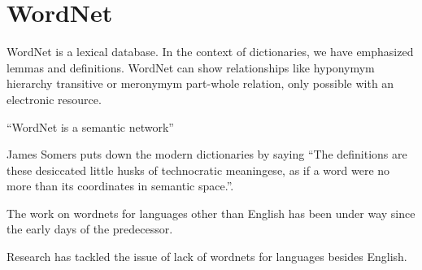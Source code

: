 \section{WordNet}%
\label{sec:wordnet}
WordNet\cite{fellbaum_wordnet_1998-1} is a lexical database.
In the context of dictionaries, we have emphasized lemmas and definitions.
WordNet can show relationships like hyponymym hierarchy transitive or meronymym part-whole relation, only possible with an electronic resource.

\enquote{WordNet is a semantic network}\cite{fellbaum_wordnet_1998-1}

James Somers puts down the modern dictionaries by saying \enquote{The definitions are these desiccated little husks of technocratic meaningese, as if a word were no more than its coordinates in semantic space.}\cite{somers_youre_2014}.

The work on wordnets for languages other than English has been under way since the early days of the predecessor.

Research has tackled the issue of lack of wordnets for languages besides English. %

